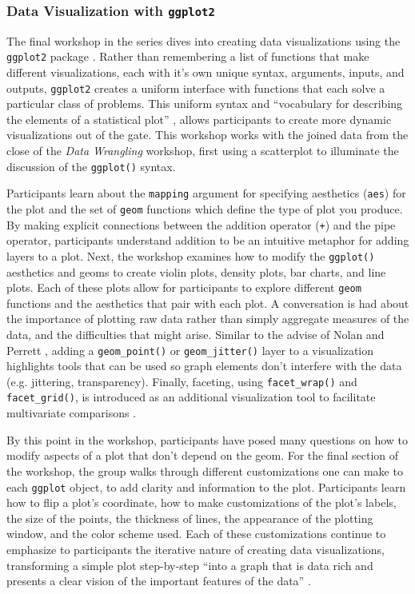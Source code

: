 \documentclass[12pt]{article}
\begin{document}
\subsubsection{Data Visualization with \texttt{ggplot2}}
\label{sec:vizual} 

\quad The final workshop in the series dives into creating data visualizations
using the \texttt{ggplot2} package \citep{ggplot}. Rather than remembering a
list of functions that make different visualizations, each with it's own unique
syntax, arguments, inputs, and outputs, \texttt{ggplot2} creates a uniform
interface with functions that each solve a particular class of problems. This
uniform syntax and ``vocabulary for describing the elements of a statistical 
plot'' \citep[p.\ 261]{nolan-viz}, allows participants to create more dynamic 
visualizations out of the gate. This workshop works with the joined data from 
the close of the \emph{Data Wrangling} workshop, first using a scatterplot to 
illuminate the discussion of the \texttt{ggplot()} syntax.

\quad Participants learn about the \texttt{mapping} argument for specifying
aesthetics (\texttt{aes}) for the plot and the set of \texttt{geom} functions 
which define the type of plot you produce. By making explicit connections
between the addition operator (\texttt{+}) and the pipe operator, participants
understand addition to be an intuitive metaphor for adding layers to a plot. 
Next, the workshop examines how to modify the \texttt{ggplot()} aesthetics and 
geoms to create violin plots, density plots, bar charts, and line plots. Each of
these plots allow for participants to explore different \texttt{geom} functions
and the aesthetics that pair with each plot. A conversation is had about the
importance of plotting raw data rather than simply aggregate measures of the
data, and the difficulties that might arise. Similar to the advise of Nolan and
Perrett \citeyear{nolan-viz}, adding a \texttt{geom\_point()} or 
\texttt{geom\_jitter()} layer to a visualization highlights tools that can be 
used so graph elements don't interfere with the data (e.g. jittering,
transparency). Finally, faceting, using \texttt{facet\_wrap()} and
\texttt{facet\_grid()}, is introduced as an additional visualization tool to
facilitate multivariate comparisons \citep[p.\ 261]{nolan-viz}. 

\quad By this point in the workshop, participants have posed many questions on
how to modify aspects of a plot that don't depend on the geom. For the final 
section of the workshop, the group walks through different customizations one 
can make to each \texttt{ggplot} object, to add clarity and information to the 
plot. Participants learn how to flip a plot's coordinate, how to make
customizations of the plot's labels, the size of the points, the thickness of
lines, the appearance of the plotting window, and the color scheme used. Each of
these customizations continue to emphasize to participants the iterative nature 
of creating data visualizations, transforming a simple plot step-by-step ``into
a graph that is data rich and presents a clear vision of the important features
of the data'' \citep[p.\ 262]{nolan-viz}.
\end{document}
